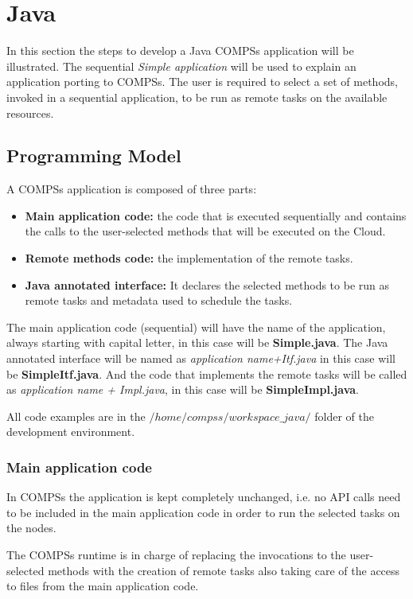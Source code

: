 \section{Java}
\label{sec:Java}

In this section the steps to develop a Java COMPSs application will be illustrated. The sequential \textit{Simple application}
will be used to explain an application porting to COMPSs. The user is required to select a set of
methods, invoked in a sequential application, to be run as remote tasks on the available resources.

\subsection{Programming Model}
A COMPSs application is composed of three parts:
\begin{itemize}
 \item \textbf{Main application code:} the code that is executed sequentially and contains the calls to the user-selected methods 
 that will be executed on the Cloud.
 \item \textbf{Remote methods code:} the implementation of the remote tasks.
 \item \textbf{Java annotated interface:} It declares the selected methods to be run as remote tasks and metadata used to 
 schedule the tasks.
\end{itemize}

The main application code (sequential) will have the name of the application, always starting with capital
letter, in this case will be \textbf{Simple.java}. The Java annotated interface will be named as \textit{application name+Itf.java} 
in this case will be \textbf{SimpleItf.java}. And the code that implements the remote tasks will be called as
\textit{application name + Impl.java}, in this case will be \textbf{SimpleImpl.java}.

All code examples are in the $/home/compss/workspace\_java/$ folder of the development environment.


\subsubsection{Main application code}

In COMPSs the application is kept completely unchanged, i.e. no API calls need to be included in the main
application code in order to run the selected tasks on the nodes.

The COMPSs runtime is in charge of replacing the invocations to the user-selected methods with the
creation of remote tasks also taking care of the access to files from the main application code.

